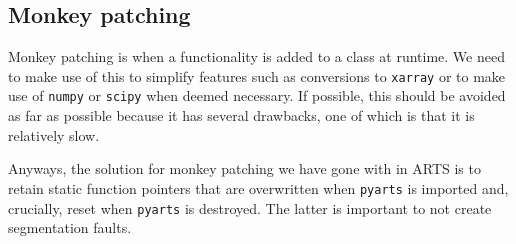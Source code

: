 \subsection{Monkey patching}
Monkey patching is when a functionality is added to a class at runtime.  We need to make use of this to simplify features such as
conversions to \texttt{xarray} or to make use of \texttt{numpy} or \texttt{scipy} when deemed necessary.  If possible, this should be
avoided as far as possible because it has several drawbacks, one of which is that it is relatively slow.

Anyways, the solution for monkey patching we have gone with in ARTS is to retain static function pointers that are overwritten
when \texttt{pyarts} is imported and, crucially, reset when \texttt{pyarts} is destroyed.  The latter is important to not create
segmentation faults.

